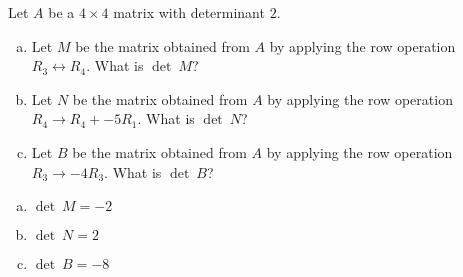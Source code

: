 
\begin{exerciseStatement}


Let \(A\) be a \(4 \times 4\) matrix with determinant \( 2 \).


\begin{enumerate}[(a)]
\item Let \(M\) be the matrix obtained from \(A\) by applying the row operation \( R_3 \leftrightarrow R_4 \). What is \(\operatorname{det}\ M\)?
\item Let \(N\) be the matrix obtained from \(A\) by applying the row operation \( R_4 \to R_4 + -5R_1 \). What is \(\operatorname{det}\ N\)?
\item Let \(B\) be the matrix obtained from \(A\) by applying the row operation \( R_3 \to -4R_3 \). What is \(\operatorname{det}\ B\)?
\end{enumerate}
    
\end{exerciseStatement}
    
\begin{exerciseAnswer} 

\begin{enumerate}[(a)]
\item \(\operatorname{det}\ M= -2 \)
\item \(\operatorname{det}\ N= 2 \)
\item \(\operatorname{det}\ B= -8 \)
\end{enumerate}
    
\end{exerciseAnswer}
    
